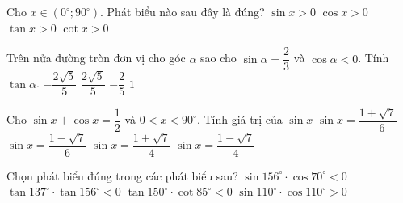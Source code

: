 \begin{ex}
	Cho $x\in\left(0^\circ;90^\circ\right)$. Phát biểu nào sau đây là đúng?
	\choice
	{\True $\sin x>0$}
	{$\cos x>0$}
	{$\tan x>0$}
	{$\cot x>0$}
\end{ex}
\begin{ex}
	Trên nửa đường tròn đơn vị cho góc $\alpha$ sao cho $\sin\alpha=\dfrac{2}{3}$ và $\cos\alpha<0$. Tính $\tan\alpha$.
	\choice
	{\True $-\dfrac{2\sqrt{5}}{5}$}
	{$\dfrac{2\sqrt{5}}{5}$}
	{$-\dfrac{2}{5}$}
	{$1$}
\end{ex}
\begin{ex}
	Cho $\sin x+\cos x=\dfrac{1}{2}$ và $0<x<90^\circ$. Tính giá trị của $\sin x$
	\choice
	{$\sin x=\dfrac{1+\sqrt{7}}{-6}$}
	{$\sin x=\dfrac{1-\sqrt{7}}{6}$}
	{\True $\sin x=\dfrac{1+\sqrt{7}}{4}$}
	{$\sin x=\dfrac{1-\sqrt{7}}{4}$}
\end{ex}
\begin{ex}
	Chọn phát biểu đúng trong các phát biểu sau?
	\choice
	{$\sin 156^\circ\cdot\cos70^\circ<0$}
	{$\tan 137^\circ\cdot\tan 156^\circ<0$}
	{\True $\tan150^\circ\cdot\cot85^\circ<0$}
	{$\sin 110^\circ\cdot\cos 110^\circ>0$}
\end{ex}
